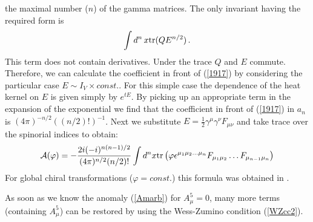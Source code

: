 the maximal number
($n$) of the gamma matrices. 
The only invariant having the required  form is
\begin{equation}
\int d^n\,x {\rm tr}(QE^{n/2})\,.  
\label{1917}
\end{equation}
This term does not contain derivatives. Under the trace
$Q$ and $E$ commute. Therefore, we can calculate
the coefficient in front of (\ref{1917}) by considering the particular
case $E\sim {I}_V\times {const.}$. For this simple case
the dependence of the heat kernel on $E$ is given simply by $e^{tE}$.
By picking up an appropriate term in the expansion of the
exponential we find that the coefficient in front of (\ref{1917})
in $a_n$ is $(4\pi )^{-n/2} ((n/2)!)^{-1}$. Next we substitute
$E=\frac 12 \gamma^\mu \gamma^\nu F_{\mu\nu}$ 
and take trace over the spinorial indices to obtain:
\begin{equation}
\mathcal{A}(\varphi )=-\frac{2i (-i)^{n(n-1)/2}}{(4\pi)^{n/2}(n/2)!}
\int d^nx {\rm tr}\left(\varphi \epsilon^{\mu_1\mu_2\dots\mu_n}
F_{\mu_1\mu_2}\dots F_{\mu_{n-1}\mu_n} \right)
\label{Amarb}
\end{equation}
For global chiral transformations ($\varphi = const.$) this formula
was obtained in \cite{Wipf:1995dy}.

As soon as we know the anomaly (\ref{Amarb}) for $A_\mu^5=0$, many
more terms (containing $A_\mu^5$) can be restored by using the 
Wess-Zumino condition (\ref{WZcc2}).

